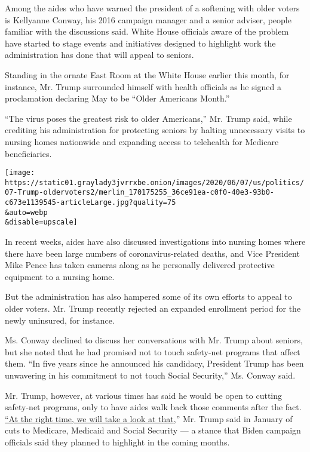 Among the aides who have warned the president of a softening with older
voters is Kellyanne Conway, his 2016 campaign manager and a senior
adviser, people familiar with the discussions said. White House
officials aware of the problem have started to stage events and
initiatives designed to highlight work the administration has done that
will appeal to seniors.

Standing in the ornate East Room at the White House earlier this month,
for instance, Mr. Trump surrounded himself with health officials as he
signed a proclamation declaring May to be ``Older Americans Month.''

``The virus poses the greatest risk to older Americans,'' Mr. Trump
said, while crediting his administration for protecting seniors by
halting unnecessary visits to nursing homes nationwide and expanding
access to telehealth for Medicare beneficiaries.

\texttt{[image: https://static01.graylady3jvrrxbe.onion/images/2020/06/07/us/politics/07-Trump-oldervoters2/merlin\_170175255\_36ce91ea-c0f0-40e3-93b0-c673e1139545-articleLarge.jpg?quality=75\\\&auto=webp\\\&disable=upscale]}

In recent weeks, aides have also discussed investigations into nursing
homes where there have been large numbers of coronavirus-related deaths,
and Vice President Mike Pence has taken cameras along as he personally
delivered protective equipment to a nursing home.

But the administration has also hampered some of its own efforts to
appeal to older voters. Mr. Trump recently rejected an expanded
enrollment period for the newly uninsured, for instance.

Ms. Conway declined to discuss her conversations with Mr. Trump about
seniors, but she noted that he had promised not to touch safety-net
programs that affect them. ``In five years since he announced his
candidacy, President Trump has been unwavering in his commitment to not
touch Social Security,'' Ms. Conway said.

Mr. Trump, however, at various times has said he would be open to
cutting safety-net programs, only to have aides walk back those comments
after the fact.
\href{https://slate.com/business/2020/01/trump-entitlements-social-security-medicare-davos.html}{``At
the right time, we will take a look at that},'' Mr. Trump said in
January of cuts to Medicare, Medicaid and Social Security --- a stance
that Biden campaign officials said they planned to highlight in the
coming months.

